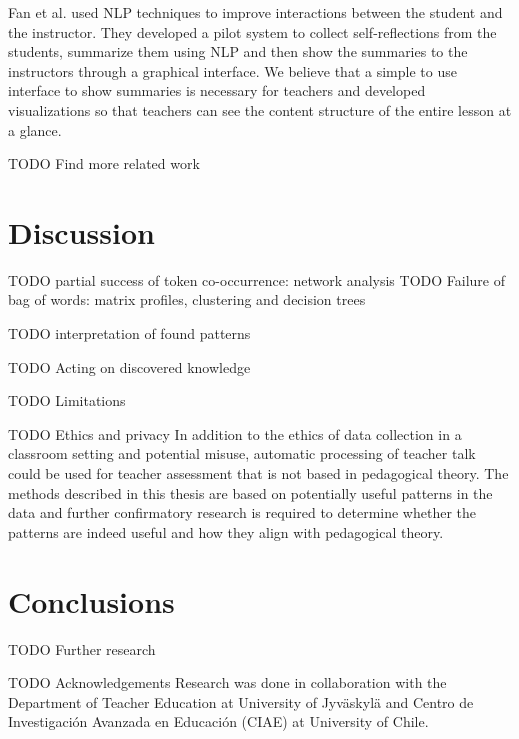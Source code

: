 \documentclass[utf8,english]{gradu3}
\begin{document}
Fan et al. \parencite*{fanCourseMIRROREnhancingLarge2015} used NLP techniques to improve interactions between the student and the instructor. They developed a pilot system to collect self-reflections from the students, summarize them using NLP and then show the summaries to the instructors through a graphical interface. We believe that a simple to use interface to show summaries is necessary for teachers and developed visualizations so that teachers can see the content structure of the entire lesson at a glance.

TODO Find more related work

\chapter{Discussion}

TODO partial success of token co-occurrence: network analysis
TODO Failure of bag of words: matrix profiles, clustering and decision trees

TODO interpretation of found patterns

TODO Acting on discovered knowledge


TODO Limitations

TODO Ethics and privacy
In addition to the ethics of data collection in a classroom setting and potential misuse, automatic processing of teacher talk could be used for teacher assessment that is not based in pedagogical theory. The methods described in this thesis are based on potentially useful patterns in the data and further confirmatory research is required to determine whether the patterns are indeed useful and how they align with pedagogical theory.

\chapter{Conclusions}




TODO Further research



TODO Acknowledgements
Research was done in collaboration with the Department of Teacher Education at University of Jyväskylä and Centro de Investigación Avanzada en Educación (CIAE) at University of Chile.
 
\printbibliography
\end{document}

